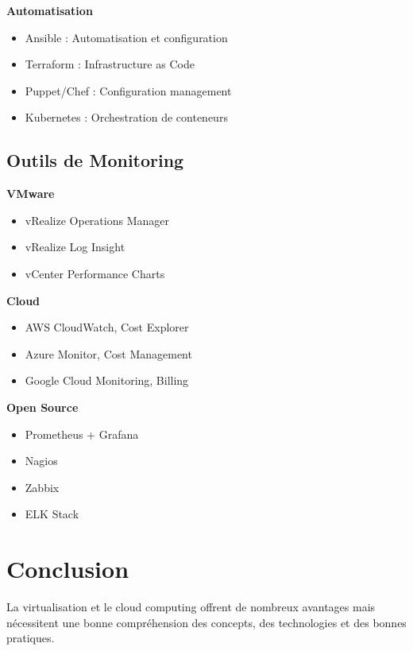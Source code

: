\documentclass[11pt,a4paper]{article}
\begin{document}
\textbf{Automatisation}
\begin{itemize}
    \item Ansible : Automatisation et configuration
    \item Terraform : Infrastructure as Code
    \item Puppet/Chef : Configuration management
    \item Kubernetes : Orchestration de conteneurs
\end{itemize}

\subsection{Outils de Monitoring}

\textbf{VMware}
\begin{itemize}
    \item vRealize Operations Manager
    \item vRealize Log Insight
    \item vCenter Performance Charts
\end{itemize}

\textbf{Cloud}
\begin{itemize}
    \item AWS CloudWatch, Cost Explorer
    \item Azure Monitor, Cost Management
    \item Google Cloud Monitoring, Billing
\end{itemize}

\textbf{Open Source}
\begin{itemize}
    \item Prometheus + Grafana
    \item Nagios
    \item Zabbix
    \item ELK Stack
\end{itemize}

\section{Conclusion}

La virtualisation et le cloud computing offrent de nombreux avantages mais nécessitent une bonne compréhension des concepts, des technologies et des bonnes pratiques.
\end{document}
